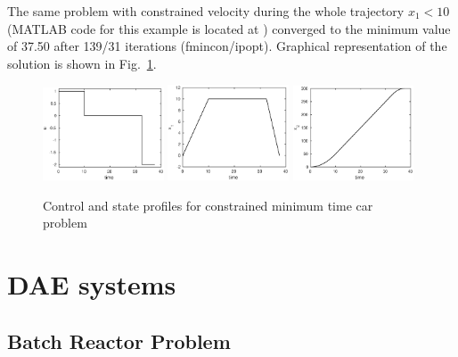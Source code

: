 The same problem with constrained velocity during the whole trajectory
$x_1 < 10$ (MATLAB code for this example is located at
) converged to the minimum value of 37.50
after 139/31 iterations (fmincon/ipopt). Graphical representation of
the solution is shown in Fig.~\ref{fig:car2}.


\begin{figure}[htb]
\includegraphics[width=0.32\textwidth]{examples/problem-car2/car_u.eps}
\includegraphics[width=0.32\textwidth]{examples/problem-car2/car_x1.eps}
\includegraphics[width=0.32\textwidth]{examples/problem-car2/car_x2.eps}
\caption{Control and state profiles for
  constrained minimum time car problem} \label{fig:car2} 
\end{figure}

\section{DAE systems}
\label{sec:daes}

\subsection{Batch Reactor Problem}
\label{sec:brpdae}

